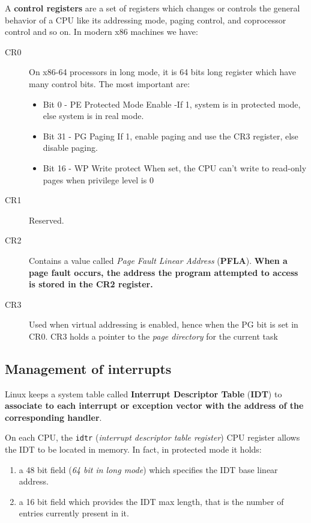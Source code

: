 \documentclass[10pt,a4paper]{article}
\begin{document}
A \textbf{control registers} are a set of registers which changes or controls the general behavior of a CPU like its addressing mode, paging control, and coprocessor control and so on. In modern x86 machines we have:
\begin{description}
\item[CR0] On x86-64 processors in long mode, it is 64 bits long register which have many control bits. The most important are:
\begin{itemize}
\item Bit 0 - PE Protected Mode Enable -If 1, system is in protected mode, else system is in real mode.
\item Bit 31 - PG Paging If 1, enable paging and use the CR3 register, else disable paging. 
\item Bit 16 - WP Write protect When set, the CPU can't write to read-only pages when privilege level is 0 
\end{itemize}
\item[CR1] Reserved.
\item[CR2] Contains a value called \textit{Page Fault Linear Address} (\textbf{PFLA}). \textbf{When a page fault occurs, the address the program attempted to access is stored in the CR2 register.}
\item[CR3] Used when virtual addressing is enabled, hence when the PG bit is set in CR0. CR3 holds a pointer to the \textit{page directory} for the current task
\end{description}

\subsection{Management of interrupts}

Linux keeps a system table called \textbf{Interrupt Descriptor Table} (\textbf{IDT}) to \textbf{associate to each interrupt or exception vector with the address of the corresponding handler}. 

On each CPU, the \texttt{idtr} (\textit{interrupt descriptor table register}) CPU register allows the IDT to be located in memory. In fact, in protected mode it holds:
\begin{enumerate}
\item a 48 bit field (\textit{64 bit in long mode}) which specifies the IDT base linear address.
\item a 16 bit field which provides the IDT max length, that is the number of entries currently present in it. 
\end{enumerate}
\end{document}
